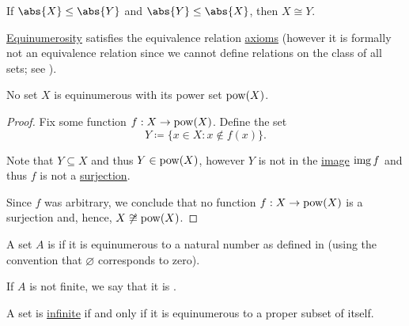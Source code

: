 \begin{theorem}\label{thm:cantor_schroder_bernstein}
  If \( \abs{X} \leq \abs{Y} \) and \( \abs{Y} \leq \abs{X} \), then \( X \cong Y \).
\end{theorem}

\medskip

\begin{proposition}\label{thm:equinumerousity_equivalence}
  \hyperref[def:equinumerous_sets]{Equinumerosity} satisfies the equivalence relation \hyperref[def:equivalence_relation]{axioms} (however it is formally not an equivalence relation since we cannot define relations on the class of all sets; see ).
\end{proposition}

\begin{theorem}[Cantor]\label{thm:cantor_power_set_theorem}
  No set \( X \) is equinumerous with its power set \( \operatorname{pow}(X) \).
\end{theorem}
\begin{proof}
  Fix some function \( f: X \to \operatorname{pow}(X) \). Define the set
  \begin{equation*}
    Y \coloneqq \{ x \in X \colon x \not\in f(x) \}.
  \end{equation*}

  Note that \( Y \subseteq X \) and thus \( Y \in \operatorname{pow}(X) \), however \( Y \) is not in the \hyperref[def:function]{image} \( \operatorname{img} f \) and thus \( f \) is not a \hyperref[def:function_invertibility/surjective]{surjection}.

  Since \( f \) was arbitrary, we conclude that no function \( f: X \to \operatorname{pow}(X) \) is a surjection and, hence, \( X \not\cong \operatorname{pow}(X) \).
\end{proof}

\begin{definition}\label{def:finite_set}
  A set \( A \) is  if it is equinumerous to a natural number as defined in  (using the convention that \( \varnothing \) corresponds to zero).

  If \( A \) is not finite, we say that it is .
\end{definition}

\begin{proposition}\label{thm:infinite_set_iff_equinumerous_to_proper_subset}
  A set is \hyperref[def:finite_set]{infinite} if and only if it is equinumerous to a proper subset of itself.
\end{proposition}

